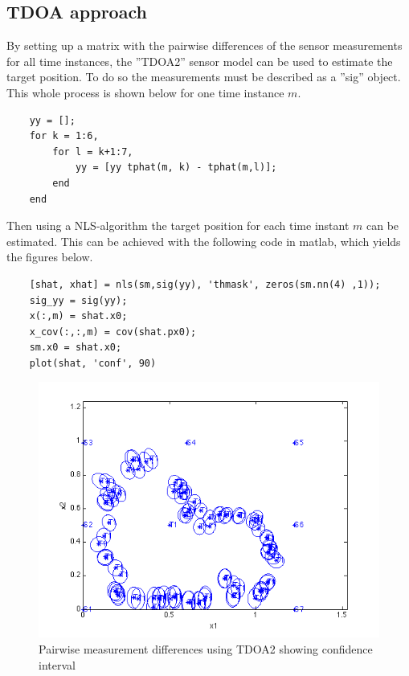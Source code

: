 \documentclass[10pt,a4paper]{report}
\begin{document}
\subsection{TDOA approach}
\label{Pairwise difference approach}
By setting up a matrix with the pairwise differences of the sensor measurements for all time instances, the ''TDOA2'' sensor model can be used to estimate the target position. To do so the measurements must be described as a ''sig'' object. This whole process is shown below for one time instance $m$.
\begin{verbatim}
    yy = [];
    for k = 1:6,
        for l = k+1:7,
            yy = [yy tphat(m, k) - tphat(m,l)];
        end
    end
\end{verbatim}
 Then using a NLS-algorithm the target position for each time instant $m$ can be estimated. This can be achieved with the following code in matlab, which yields the figures below.
 \begin{verbatim}
    [shat, xhat] = nls(sm,sig(yy), 'thmask', zeros(sm.nn(4) ,1));
    sig_yy = sig(yy);
    x(:,m) = shat.x0;
    x_cov(:,:,m) = cov(shat.px0);
    sm.x0 = shat.x0;
    plot(shat, 'conf', 90)
 \end{verbatim}
 \begin{figure}[H]
   \includegraphics[width = 350pt]{TDAO_target_est1.png}
   \caption{Pairwise measurement differences using TDOA2 showing confidence interval}
   \label{TDOA_target_est1}
 \end{figure}
\end{document}
